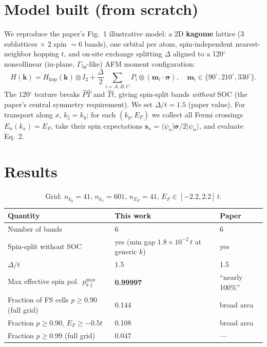 \documentclass[11pt]{article}
\begin{document}
\section{Model built (from scratch)}
We reproduce the paper's Fig.~1 illustrative model: a 2D \textbf{kagome} lattice
(3 sublattices $\times$ 2 spin $=6$ bands), one orbital per atom, spin-independent
nearest-neighbor hopping $t$, and on-site exchange splitting $\Delta$ aligned to a
120$^\circ$ noncollinear (in-plane, $\Gamma_{5g}$-like) AFM moment configuration:
\begin{equation}
H(\mathbf{k}) = H_{\text{hop}}(\mathbf{k})\otimes I_2
+ \frac{\Delta}{2}\sum_{i=A,B,C} P_i\otimes(\mathbf{m}_i\cdot\boldsymbol{\sigma}),
\quad \mathbf{m}_i \in \{90^\circ,210^\circ,330^\circ\}.
\end{equation}
The 120$^\circ$ texture breaks $\hat P\hat T$ and $\hat T\hat t$, giving spin-split
bands \emph{without} SOC (the paper's central symmetry requirement). We set
$\Delta/t=1.5$ (paper value). For transport along $x$, $k_\parallel=k_y$; for each
$(k_y,E_F)$ we collect all Fermi crossings $E_n(k_x)=E_F$, take their spin
expectations $\mathbf{s}_n=\langle\psi_n|\boldsymbol{\sigma}/2|\psi_n\rangle$, and
evaluate Eq.~2.

\section{Results}
\begin{table}[h]\centering
\begin{tabular}{lll}
\toprule
Quantity & This work & Paper \\
\midrule
Number of bands & 6 & 6 \\
Spin-split without SOC & yes (min gap $1.8\times10^{-2}\,t$ at generic $k$) & yes \\
$\Delta/t$ & 1.5 & 1.5 \\
Max effective spin pol.\ $p_{k\parallel}^{\max}$ & \textbf{0.99997} & ``nearly 100\%'' \\
Fraction of FS cells $p\ge0.90$ (full grid) & 0.144 & broad area \\
Fraction $p\ge0.90$, $E_F\ge-0.5t$ & 0.108 & broad area \\
Fraction $p\ge0.99$ (full grid) & 0.047 & --- \\
\bottomrule
\end{tabular}
\caption{Grid: $n_{k_y}=41$, $n_{k_x}=601$, $n_{E_F}=41$, $E_F\in[-2.2,2.2]\,t$.}
\end{table}
\end{document}
